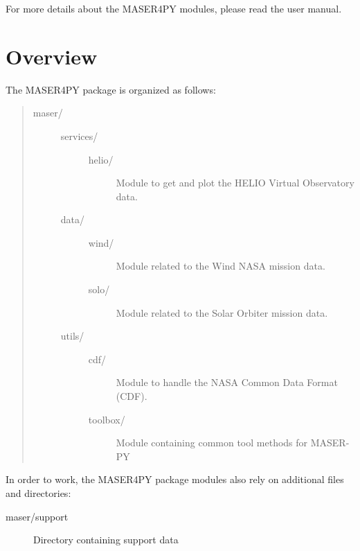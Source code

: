 \documentclass[letterpaper,10pt,english]{sphinxmanual}
\begin{document}
For more details about the MASER4PY modules, please read the user manual.


\chapter{Overview}
\label{intro:overview}
The MASER4PY package is organized as follows:
\begin{quote}
\begin{description}
\item[{maser/}] \leavevmode\begin{description}
\item[{services/}] \leavevmode\begin{description}
\item[{helio/}] \leavevmode
Module to get and plot the HELIO Virtual Observatory data.

\end{description}

\item[{data/}] \leavevmode\begin{description}
\item[{wind/}] \leavevmode
Module related to the Wind NASA mission data.

\item[{solo/}] \leavevmode
Module related to the Solar Orbiter mission data.

\end{description}

\item[{utils/}] \leavevmode\begin{description}
\item[{cdf/}] \leavevmode
Module to handle the NASA Common Data Format (CDF).

\item[{toolbox/}] \leavevmode
Module containing common tool methods for MASER-PY

\end{description}

\end{description}

\end{description}
\end{quote}

In order to work, the MASER4PY package modules also rely on additional files and directories:
\begin{description}
\item[{maser/support}] \leavevmode
Directory containing support data

\end{description}
\end{document}
